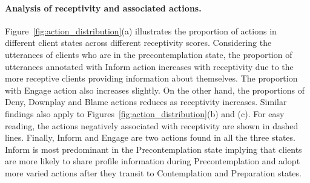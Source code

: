 \paragraph{Analysis of receptivity and associated actions.} Figure~\ref{fig:action_distribution}(a) illustrates the proportion of actions in different client states across different receptivity scores. Considering the utterances of clients who are in the precontemplation state, the proportion of utterances annotated with Inform action increases with receptivity due to the more receptive clients providing information about themselves.  The proportion with Engage action also increases slightly.  On the other hand, the proportions of Deny, Downplay and Blame actions reduces as receptivity increases. Similar findings also apply to Figures~\ref{fig:action_distribution}(b) and (c).  For easy reading, the actions negatively associated with receptivity are shown in dashed lines.  %
Finally, Inform and Engage are two actions found in all the three states. Inform is most predominant in the Precontemplation state implying that clients are more likely to share profile information during Precontemplation and adopt more varied actions after they transit to Contemplation and Preparation states. 

